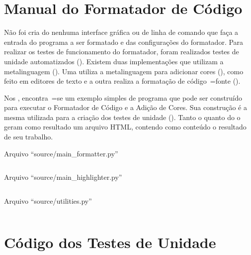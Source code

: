 

\chapter{Manual do Formatador de Código}
\label{manualDoFormatadorDeCodigo}

Não foi cria do nenhuma interface gráfica ou
de linha de comando que faça a entrada do programa a ser formatado e
das configurações do formatador.
Para realizar os testes de funcionamento do formatador,
foram realizados testes de unidade automatizados ().
Existem duas implementações que utilizam a metalinguagem ().
Uma utiliza a metalinguagem para adicionar cores (),
como feito em editores de texto e
a outra realiza a formatação de código~=fonte ().

Nos ,
encontra~=se um exemplo simples de programa que pode ser construído para executar o Formatador de Código e
a Adição de Cores.
Sua construção é a mesma utilizada para a criação dos testes de unidade ().
Tanto o  quanto do o  geram como resultado um arquivo HTML,
contendo como conteúdo o resultado de seu trabalho.
\begin{code}
\caption{Arquivo ``source/main\_formatter.py''}
\label{mainHighlighterPy}
\inputminted[fontsize=\small,linenos=true,numberblanklines=true,breaklines=true]{python3}{../source/main_formatter.py}
\end{code}
\begin{code}
\caption{Arquivo ``source/main\_highlighter.py''}
\label{mainFormatterPy}
\inputminted[fontsize=\small,linenos=true,numberblanklines=true,breaklines=true]{python3}{../source/main_formatter.py}
\end{code}
\begin{code}
\caption{Arquivo ``source/utilities.py''}
\label{utilitiesPy}
\inputminted[fontsize=\small,linenos=true,numberblanklines=true,breaklines=true]{python3}{../source/utilities.py}
\end{code}


\chapter{Código dos Testes de Unidade}

